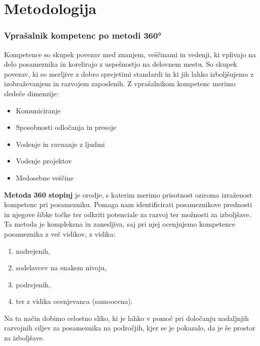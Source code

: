 \chapter{Metodologija}
\subsection{Vprašalnik kompetenc po metodi 360°} 
Kompetence so skupek povezav med znanjem, veščinami in vedenji, ki vplivajo na delo posameznika in korelirajo z uspešnostjo na delovnem mestu. So skupek povezav, ki so merljive z dobro sprejetimi standardi in ki jih lahko izboljšujemo z izobraževanjem in razvojem zaposlenih. Z vprašalnikom kompetenc merimo sledeče dimenzije: 


\begin{itemize}
\item Komuniciranje
\item Sposobnosti odločanja in presoje
\item Vodenje in ravnanje z ljudmi
\item Vodenje projektov
\item Medosebne veščine
\end{itemize} 
\bigskip
 \textbf{Metoda 360 stopinj} je orodje, s katerim merimo prisotnost oziroma izraženost kompetenc pri posamezniku. Pomaga nam identificirati posameznikove prednosti in njegove šibke točke ter odkriti potenciale za razvoj ter možnosti za izboljšave. Ta metoda je kompleksna in zanesljiva, saj pri njej ocenjujemo kompetence posameznika z več vidikov, z vidika:
\begin{enumerate}
  \item nadrejenih,
  \item sodelavcev na enakem nivoju,
  \item podrejenih,
  \item ter z vidika ocenjevanca (samoocena).
\end{enumerate}
Na ta način dobimo celostno sliko, ki je lahko v pomoč pri določanju nadaljnjih razvojnih ciljev za posameznika na področjih, kjer se je pokazalo, da je še prostor za izboljšave. 
